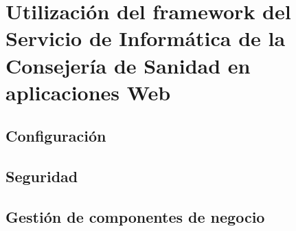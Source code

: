 \chapter{Utilizaci\'{o}n del framework del Servicio de Inform\'{a}tica de la Consejer\'{i}a de Sanidad en aplicaciones Web}

\section{Configuraci\'{o}n}

\section{Seguridad}

\section{Gesti\'{o}n de componentes de negocio}

 

